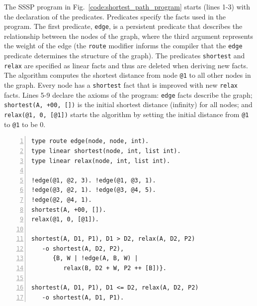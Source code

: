 The SSSP program in Fig.~\ref{code:shortest_path_program} starts (lines 1-3)
with the declaration of the predicates. Predicates specify the facts
used in the program. The first predicate, \texttt{edge}, is a persistent
predicate that describes the relationship between the nodes of the graph,
where the third argument represents the weight of the edge (the
\texttt{route} modifier informs the compiler that the \texttt{edge} predicate
determines the structure of the graph).
The predicates \texttt{shortest} and \texttt{relax} are
specified as linear facts and thus are deleted when deriving new facts.  The
algorithm computes the shortest distance from node
\texttt{@1} to all other nodes in the graph. Every node has a
\texttt{shortest} fact that is improved with new \texttt{relax} facts.  Lines
5-9 declare the axioms of the program: \texttt{edge} facts describe the
graph; \texttt{shortest(A, +00, [])} is the initial shortest distance
(infinity) for all nodes; and \texttt{relax(@1, 0, [@1])} starts the
algorithm by setting the initial distance from \texttt{@1} to \texttt{@1} to be
0.

\begin{topfig}
\scriptsize\begin{Verbatim}[numbers=left]
type route edge(node, node, int).
type linear shortest(node, int, list int).
type linear relax(node, int, list int).

!edge(@1, @2, 3). !edge(@1, @3, 1).
!edge(@3, @2, 1). !edge(@3, @4, 5).
!edge(@2, @4, 1).
shortest(A, +00, []).
relax(@1, 0, [@1]).

shortest(A, D1, P1), D1 > D2, relax(A, D2, P2)
   -o shortest(A, D2, P2),
      {B, W | !edge(A, B, W) |
         relax(B, D2 + W, P2 ++ [B])}.

shortest(A, D1, P1), D1 <= D2, relax(A, D2, P2)
   -o shortest(A, D1, P1).
\end{Verbatim}
\end{topfig}

